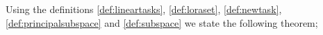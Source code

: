 Using the definitions \ref{def:lineartasks}, \ref{def:loraset}, \ref{def:newtask}, \ref{def:principalsubspace} and \ref{def:subspace} we state the following theorem; 
\begin{theorem}
\label{thm:2}

\end{theorem}
